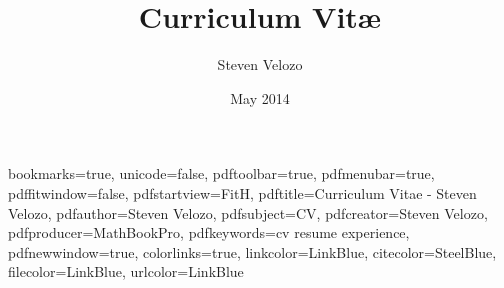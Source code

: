 
\usepackage{amsmath}

\usepackage{graphicx}
\graphicspath{{graphics/}}

\title{Curriculum Vit\ae}
\author[Steven Velozo]{Steven Velozo}
\date{May 2014}
\newcommand{\displayaddress}{\marginnote[0.9cm]{\raggedleft{\href{mailto:steven@velozo.com}{steven@velozo.com}\\(206) 604-4981 }}}

\usepackage{booktabs}
\usepackage{units}
\usepackage{fancyvrb}

\usepackage{multicol}

\usepackage{rotating}
\usepackage{tikz}
\usetikzlibrary{arrows,backgrounds,snakes}


\newcommand{\mhstandout}[1]{\textbf{\textcolor{DarkGray}{#1}}}
\newcommand{\shstandout}[1]{\textbf{\textcolor{BurntOrange}{#1}}}
\newcommand{\shyears}[1]{\small{\texttt{\textcolor{LightGray}{#1}}}}
\newcommand{\pstandout}[1]{\textcolor{BrightRed}{#1}}
\newcommand{\competency}[1]{\textcolor{BrightRed}{#1}}

\hypersetup
{
    bookmarks=true,         %
    unicode=false,          %
    pdftoolbar=true,        %
    pdfmenubar=true,        %
    pdffitwindow=false,     %
    pdfstartview={FitH},    %
    pdftitle={Curriculum Vitae - Steven Velozo},    %
    pdfauthor={Steven Velozo},     %
    pdfsubject={CV},   %
    pdfcreator={Steven Velozo},   %
    pdfproducer={MathBookPro}, %
    pdfkeywords={cv} {resume} {experience}, %
    pdfnewwindow=true,      %
    colorlinks=true,       %
    linkcolor=LinkBlue,          %
    citecolor=SteelBlue,        %
    filecolor=LinkBlue,      %
    urlcolor=LinkBlue           %
}

\makeatletter
\newlength{\fullpagewidth}
\AtBeginDocument{\setlength{\fullpagewidth}{\@tufte@fullwidth}}
\makeatother

\newcommand{\fullwidthmode}[1]{\noindent\begin{minipage}{\fullpagewidth}#1\end{minipage}}
